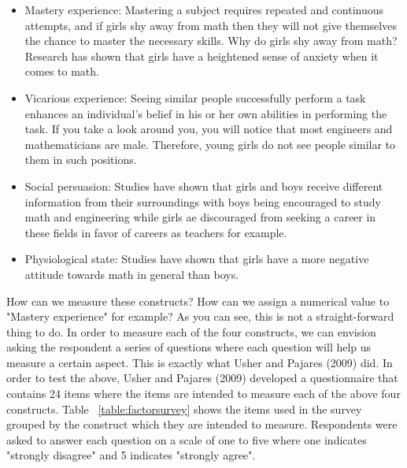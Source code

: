 \documentclass[a4paper,12pt,oneside]{book}
\begin{document}
\begin{itemize}
	\item Mastery experience: Mastering a subject requires repeated and continuous attempts, and if girls shy away from math then they will not give
	themselves the chance to master the necessary skills. Why do girls shy away from math? Research has shown that girls have a heightened sense
	of anxiety when it comes to math.
	\item Vicarious experience: Seeing similar people successfully perform a task enhances an individual’s belief in his or her own abilities in 
	performing the task. If you take a look around you, you will notice that most engineers and mathematicians are male. Therefore, young girls do
	not see people similar to them in such positions.
	\item Social persuasion: Studies have shown that girls and boys receive different information from their surroundings with boys being encouraged
	to study math and engineering while girls ae discouraged from seeking a career in these fields in favor of careers as teachers for example.
	\item Physiological state: Studies have shown that girls have a more negative attitude towards math in general than boys. 
\end{itemize}

How can we measure these constructs? How can we assign a numerical value to "Mastery experience" for example? As you can see, this is not a 
straight-forward thing to do. In order to measure each of the four constructs, we can envision asking the respondent a series of questions where
each question will help us measure a certain aspect. This is exactly what Usher and Pajares (2009) did. In order to test the above, Usher and 
Pajares (2009) developed a questionnaire that contains 24 items where the items are intended to measure each
of the above four constructs. Table ~\ref{table:factorsurvey} shows the items used in the survey grouped by the construct which they are intended
to measure. Respondents were asked to answer each question on a scale of one to five where one indicates "strongly disagree" and 5 indicates 
"strongly agree". 
\end{document}

